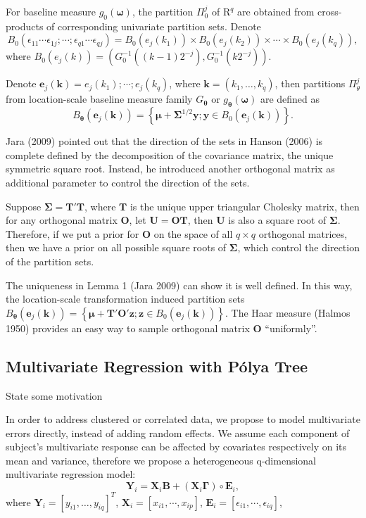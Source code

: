 \documentclass{article}
\newcommand{\polya}{P\'{o}lya}
\begin{document}
For baseline measure $g_0(\bm{\omega})$, the partition $\Pi_0^j$ of
$\mathrm{R}^q$ are obtained from cross-products of corresponding
univariate partition sets. Denote 
$$B_0( \epsilon_{11}\cdots
    \epsilon_{1j};\cdots;\epsilon_{q1}\cdots\epsilon_{qj}) =
    B_0(e_j(k_1)) \times B_0(e_j(k_2)) \times \cdots \times
    B_0(e_j(k_q)),$$
where $B_0(e_j(k))= \left( G_0^{-1}((k-1)2^{-j}), G_0^{-1}(k2^{-j})
\right)$. 

Denote $\bm{e}_j(\bm{k})= e_j(k_1); \cdots;e_j(k_q)$, where $\bm{k}=
(k_1, \ldots, k_q)$, then partitions $\Pi_{\theta}^j$ from
location-scale baseline measure family $G_{\bm{\theta}}$ or
$g_{\bm{\theta}}(\bm{\omega})$ are defined as 
\begin{displaymath}
B_{\bm{\theta}}(\bm{e}_j(\bm{k})) = \left\{ \bm{\mu} +
  \bm{\Sigma}^{1/2} \bm{y}; \bm{y} \in B_0(\bm{e}_j(\bm{k})) \right\}.
\end{displaymath}

Jara (2009) pointed out that the direction of the sets in Hanson
(2006) is complete defined by the decomposition of the covariance
matrix, the unique symmetric square root. Instead, he introduced
another orthogonal matrix as additional parameter to control the
direction of the sets. 

Suppose $\bm{\Sigma} = \bm{T'T}$, where $\bm{T}$ is the unique upper
triangular Cholesky matrix, then for any orthogonal matrix $\bm{O}$,
let $\bm{U=OT}$, then $\bm{U}$ is also a square root of
$\bm{\Sigma}$. Therefore, if we put a prior for $\bm{O}$ on the space
of all $q \times q$ orthogonal matrices, then we have a prior on all
possible square roots of $\bm{\Sigma}$, which control the direction of
the partition sets.

The uniqueness in Lemma 1 (Jara 2009) can show it is well defined. In
this way, the location-scale transformation induced partition sets
$B_{\bm{\theta}}(\bm{e}_j(\bm{k})) = \left\{ \bm{\mu} + 
  \bm{T'O'} \bm{z}; \bm{z} \in B_0(\bm{e}_j(\bm{k})) \right\}.$ The
Haar measure (Halmos 1950) provides an easy way to sample orthogonal
matrix $\bm{O}$ ``uniformly''. 

\subsection{Multivariate Regression with \polya{} Tree}
State some motivation

In order to address clustered or correlated data, we propose to model
multivariate errors directly, instead of adding random effects. We
assume each component of subject's multivariate response can be
affected by covariates respectively on its mean and variance,
therefore we propose a heterogeneous q-dimensional multivariate
regression model: 
\begin{displaymath}
\bm{Y}_i = \bm{X}_i \bm{B} + (\bm{X}_i\bm{\Gamma}) \circ \bm{E}_i,
\end{displaymath}
where $\bm{Y}_i = [y_{i1}, \ldots, y_{iq}]^T$, $\bm{X}_i= [x_{i1},
\cdots, x_{ip}]$, $\bm{E}_i =[\epsilon_{i1}, \cdots, \epsilon_{iq}]$, 
\end{document}
